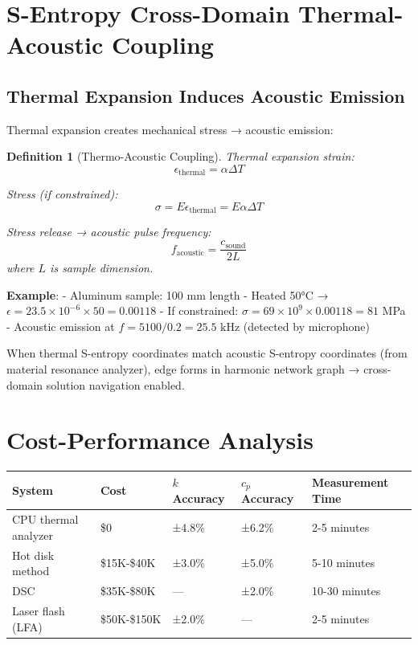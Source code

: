 \documentclass[12pt,a4paper]{article}
\newtheorem{definition}{Definition}
\begin{document}
{{\section{S-Entropy Cross-Domain Thermal-Acoustic Coupling}

\subsection{Thermal Expansion Induces Acoustic Emission}

Thermal expansion creates mechanical stress → acoustic emission:

\begin{definition}[Thermo-Acoustic Coupling]
Thermal expansion strain:
\begin{equation}
\epsilon_{\text{thermal}} = \alpha \Delta T
\end{equation}

Stress (if constrained):
\begin{equation}
\sigma = E \epsilon_{\text{thermal}} = E \alpha \Delta T
\end{equation}

Stress release → acoustic pulse frequency:
\begin{equation}
f_{\text{acoustic}} = \frac{c_{\text{sound}}}{2L}
\end{equation}
where $L$ is sample dimension.
\end{definition}

\textbf{Example}:
- Aluminum sample: 100 mm length
- Heated 50°C → $\epsilon = 23.5 \times 10^{-6} \times 50 = 0.00118$
- If constrained: $\sigma = 69 \times 10^9 \times 0.00118 = 81$ MPa
- Acoustic emission at $f = 5100 / 0.2 = 25.5$ kHz (detected by microphone)

When thermal S-entropy coordinates match acoustic S-entropy coordinates (from material resonance analyzer), edge forms in harmonic network graph → cross-domain solution navigation enabled.

\section{Cost-Performance Analysis}

\begin{center}
\begin{tabular}{|l|l|l|l|l|}
\hline
\textbf{System} & \textbf{Cost} & \textbf{$k$ Accuracy} & \textbf{$c_p$ Accuracy} & \textbf{Measurement Time} \\
\hline
CPU thermal analyzer & \$0 & ±4.8\% & ±6.2\% & 2-5 minutes \\
Hot disk method & \$15K-\$40K & ±3.0\% & ±5.0\% & 5-10 minutes \\
DSC & \$35K-\$80K & — & ±2.0\% & 10-30 minutes \\
Laser flash (LFA) & \$50K-\$150K & ±2.0\% & — & 2-5 minutes \\
\hline
\end{tabular}
\end{center}

}}
\end{document}
